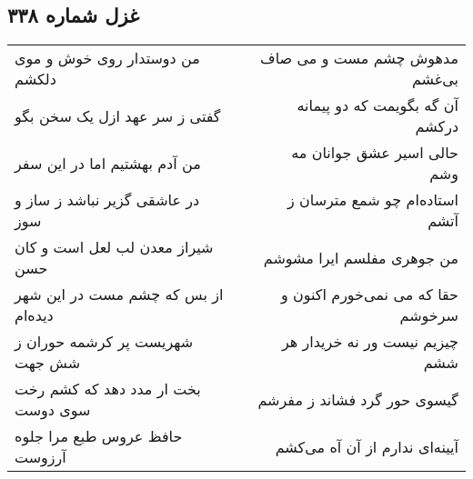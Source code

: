 \begin{center}
\section*{غزل شماره ۳۳۸}
\label{sec:sh338}
\begin{longtable}{l p{0.5cm} r}
من دوستدار روی خوش و موی دلکشم
&&
مدهوش چشم مست و می صاف بی‌غشم
\\
گفتی ز سر عهد ازل یک سخن بگو
&&
آن گه بگویمت که دو پیمانه درکشم
\\
من آدم بهشتیم اما در این سفر
&&
حالی اسیر عشق جوانان مه وشم
\\
در عاشقی گزیر نباشد ز ساز و سوز
&&
استاده‌ام چو شمع مترسان ز آتشم
\\
شیراز معدن لب لعل است و کان حسن
&&
من جوهری مفلسم ایرا مشوشم
\\
از بس که چشم مست در این شهر دیده‌ام
&&
حقا که می نمی‌خورم اکنون و سرخوشم
\\
شهریست پر کرشمه حوران ز شش جهت
&&
چیزیم نیست ور نه خریدار هر ششم
\\
بخت ار مدد دهد که کشم رخت سوی دوست
&&
گیسوی حور گرد فشاند ز مفرشم
\\
حافظ عروس طبع مرا جلوه آرزوست
&&
آیینه‌ای ندارم از آن آه می‌کشم
\\
\end{longtable}
\end{center}
